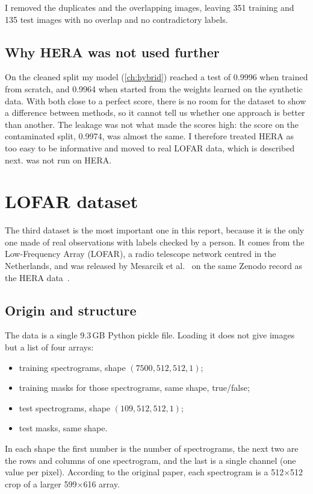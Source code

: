 I removed the duplicates and the overlapping images, leaving 351 training and
135 test images with no overlap and no contradictory labels.

\subsection{Why HERA was not used further}
On the cleaned split my model (\cref{ch:hybrid}) reached a test \Fone{} of
0.9996 when trained from scratch, and 0.9964 when started from the weights
learned on the synthetic data. With both close to a perfect score, there is no
room for the dataset to show a difference between methods, so it cannot tell
us whether one approach is better than another. The leakage was not what made
the scores high: the score on the contaminated split, 0.9974, was almost the
same. I therefore treated HERA as too easy to be informative and moved to real
LOFAR data, which is described next. \tfunet{} was not run on HERA.

\section{LOFAR dataset}
\label{sec:lofar}
The third dataset is the most important one in this report, because it is the
only one made of real observations with labels checked by a person. It comes
from the Low-Frequency Array (LOFAR), a radio telescope network centred in the
Netherlands, and was released by Mesarcik et al.~\cite{mesarcik2022} on the same
Zenodo record as the HERA data~\cite{mesarcik2022data}.

\subsection{Origin and structure}
The data is a single 9.3\,GB Python pickle file. Loading it does not give
images but a list of four arrays:
\begin{itemize}
  \item training spectrograms, shape $(7500, 512, 512, 1)$;
  \item training masks for those spectrograms, same shape, true/false;
  \item test spectrograms, shape $(109, 512, 512, 1)$;
  \item test masks, same shape.
\end{itemize}
In each shape the first number is the number of spectrograms, the next two
are the rows and columns of one spectrogram, and the last is a single channel
(one value per pixel). According to the original paper, each spectrogram is a
512$\times$512 crop of a larger 599$\times$616 array.

